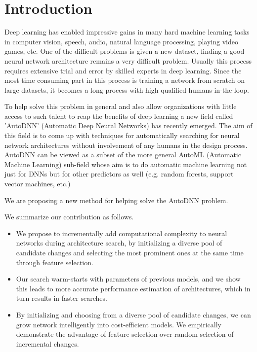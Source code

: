 \documentclass{article}
\begin{document}
\printAffiliationsAndNotice{\icmlEqualContribution} %

\section{Introduction}

Deep learning has enabled impressive gains in many hard machine learning tasks in computer vision, speech, audio, natural language processing, playing video games, etc. One of the difficult problems is given a new dataset, finding a good neural network architecture remains a very difficult problem. Usually this process requires extensive trial and error by skilled experts in deep learning. Since the most time consuming part in this process is training a network from scratch on large datasets, it becomes a long process with high qualified humans-in-the-loop. 

To help solve this problem in general and also allow organizations with little access to such talent to reap the benefits of deep learning a new field called 'AutoDNN' (Automatic Deep Neural Networks) has recently emerged. The aim of this field is to come up with techniques for automatically searching for neural network architectures without involvement of any humans in the design process. AutoDNN can be viewed as a subset of the more general AutoML (Automatic Machine Learning) sub-field whose aim is to do automatic machine learning not just for DNNs but for other predictors as well (e.g. random forests, support vector machines, etc.)

We are proposing a new method for helping solve the AutoDNN problem. 

We summarize our contribution as follows.
\begin{itemize}
\item We propose to incrementally add computational complexity to neural networks during architecture search, by initializing a diverse pool of candidate changes and selecting the most prominent ones at the same time through feature selection. 
\item Our search warm-starts with parameters of previous models, and we show this leads to more accurate performance estimation of architectures, which in turn results in faster searches.
\item By initializing and choosing from a diverse pool of candidate changes, we can grow network intelligently into cost-efficient models. We empirically demonstrate the advantage of feature selection over random selection of incremental changes. 
\end{itemize}
\end{document}
